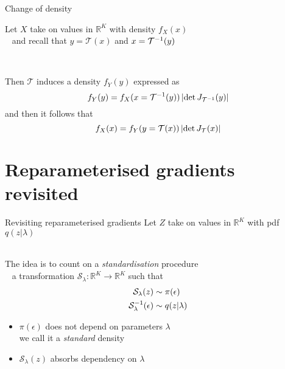 \documentclass[14pt,dvipsnames]{beamer}
\begin{document}
\begin{frame}{Change of density}

Let $X$ take on values in $\mathbb R^K$ with density $f_X(x)$\\ \pause
~ and recall that $y = \mathcal T(x)$ and $x = {\mathcal T}^{-1}(y)$\\ \pause

~

Then $\mathcal T$ induces a density $f_Y(y)$ expressed as
\begin{equation*}
f_Y(y) = f_X(x = {\mathcal T}^{-1}(y)) \left| \det J_{{\mathcal T}^{-1}}(y) \right|
\end{equation*} \pause
and then it follows that
\begin{equation*}
f_X(x) = f_Y(y=\mathcal T(x)) \left| \det J_{\mathcal T}(x) \right|
\end{equation*}

	
\end{frame}

\section{Reparameterised gradients revisited}

\begin{frame}{Revisiting reparameterised gradients}
	Let $Z$ take on values in $\mathbb R^K$ with pdf $q(z|\lambda)$ \\
	
	~ \pause

	The idea is to count on a \emph{standardisation} procedure\\ \pause
	~ a transformation $\mathcal S_\lambda: \mathbb R^K \to \mathbb R^K$ such that \pause
	\begin{equation*}
	\begin{aligned}
	\mathcal S_\lambda(z) &\sim \pi(\epsilon) \\
 	{\mathcal S}^{-1}_\lambda(\epsilon) &\sim q(z|\lambda)
	\end{aligned}
	\end{equation*} 
	\begin{itemize}
		\item $\pi(\epsilon)$ does not depend on parameters $\lambda$\\
		we call it a \emph{standard} density \pause
		\item $\mathcal S_\lambda(z)$ absorbs dependency on $\lambda$ 
	\end{itemize}

\end{frame}
\end{document}

